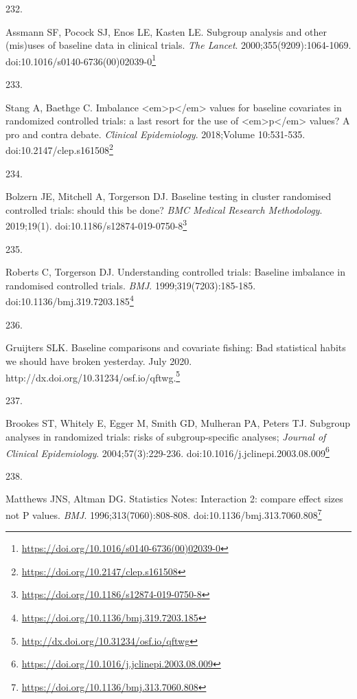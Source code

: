 \documentclass[
  a4paper,
]{book}
\newlength{\cslhangindent}
\newlength{\csllabelwidth}
\newlength{\cslentryspacingunit} %
\newenvironment{CSLReferences}[2] %
 {%
  \setlength{\parindent}{0pt}
  \ifodd #1
  \let\oldpar\par
  \def\par{\hangindent=\cslhangindent\oldpar}
  \fi
  \setlength{\parskip}{#2\cslentryspacingunit}
 }%
 {}
\newcommand{\CSLLeftMargin}[1]{\parbox[t]{\csllabelwidth}{#1}}
\newcommand{\CSLRightInline}[1]{\parbox[t]{\linewidth - \csllabelwidth}{#1}\break}
\renewcommand{\href}[2]{#2\footnote{\url{#1}}}
\begin{document}
\begin{CSLReferences}{0}{0}
\leavevmode{}%
\CSLLeftMargin{232. }%
\CSLRightInline{Assmann SF, Pocock SJ, Enos LE, Kasten LE. Subgroup analysis and other (mis)uses of baseline data in clinical trials. \emph{The Lancet}. 2000;355(9209):1064-1069. doi:\href{https://doi.org/10.1016/s0140-6736(00)02039-0}{10.1016/s0140-6736(00)02039-0}}

\leavevmode{}%
\CSLLeftMargin{233. }%
\CSLRightInline{Stang A, Baethge C. Imbalance \textless em\textgreater p\textless/em\textgreater{} values for baseline covariates in randomized controlled trials: a last resort for the use of \textless em\textgreater p\textless/em\textgreater{} values? A pro and contra debate. \emph{Clinical Epidemiology}. 2018;Volume 10:531-535. doi:\href{https://doi.org/10.2147/clep.s161508}{10.2147/clep.s161508}}

\leavevmode{}%
\CSLLeftMargin{234. }%
\CSLRightInline{Bolzern JE, Mitchell A, Torgerson DJ. Baseline testing in cluster randomised controlled trials: should this be done? \emph{BMC Medical Research Methodology}. 2019;19(1). doi:\href{https://doi.org/10.1186/s12874-019-0750-8}{10.1186/s12874-019-0750-8}}

\leavevmode{}%
\CSLLeftMargin{235. }%
\CSLRightInline{Roberts C, Torgerson DJ. Understanding controlled trials: Baseline imbalance in randomised controlled trials. \emph{BMJ}. 1999;319(7203):185-185. doi:\href{https://doi.org/10.1136/bmj.319.7203.185}{10.1136/bmj.319.7203.185}}

\leavevmode{}%
\CSLLeftMargin{236. }%
\CSLRightInline{Gruijters SLK. Baseline comparisons and covariate fishing: Bad statistical habits we should have broken yesterday. July 2020. \href{http://dx.doi.org/10.31234/osf.io/qftwg}{http://dx.doi.org/10.31234/osf.io/qftwg.}}

\leavevmode{}%
\CSLLeftMargin{237. }%
\CSLRightInline{Brookes ST, Whitely E, Egger M, Smith GD, Mulheran PA, Peters TJ. Subgroup analyses in randomized trials: risks of subgroup-specific analyses; \emph{Journal of Clinical Epidemiology}. 2004;57(3):229-236. doi:\href{https://doi.org/10.1016/j.jclinepi.2003.08.009}{10.1016/j.jclinepi.2003.08.009}}

\leavevmode{}%
\CSLLeftMargin{238. }%
\CSLRightInline{Matthews JNS, Altman DG. Statistics Notes: Interaction 2: compare effect sizes not P values. \emph{BMJ}. 1996;313(7060):808-808. doi:\href{https://doi.org/10.1136/bmj.313.7060.808}{10.1136/bmj.313.7060.808}}


\end{CSLReferences}
\end{document}
